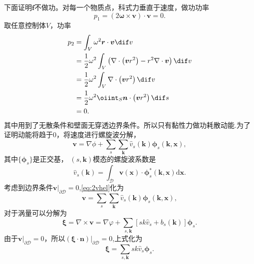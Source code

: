 \documentclass[12pt]{ctexart}
\begin{document}
下面证明$\bm{f}$不做功。对每一个物质点，科式力垂直于速度，做功功率
\begin{equation}
	p_1 = (2 \bm{\omega} \times \bm{v}) \cdot \bm{v} = 0.
\end{equation}
取任意控制体$V$，功率
\begin{equation}
	\begin{aligned}
		p_2 & =  \int_V \omega^2\bm{r} \cdot \bm{v} \dif v                                                                          \\
		    & =      \frac{1}{2} \omega^2 \int_V \left( \nabla \cdot \left(\bm{v}r^2\right) - r^2 \nabla \cdot \bm{v}\right) \dif v \\
		    & =      \frac{1}{2} \omega^2 \int_V \nabla \cdot \left(\bm{v}r^2\right)  \dif v                                        \\
		    & =      \frac{1}{2} \omega^2 \oiint_S \bm{n} \cdot \left(\bm{v}r^2\right)  \dif s                                      \\
		    & =0.
	\end{aligned}
\end{equation}
其中用到了无散条件和壁面无穿透边界条件。所以只有黏性力做功耗散动能.为了证明动能将趋于$0$，将速度进行螺旋波分解，\cite{yang_su_wu_2010}
\begin{equation}
	\bm{v}=\nabla \phi+\sum_{s} \sum_{\bm{k}} \widehat{v}_{s}(\bm{k}) \bm{\phi}_{s}(\bm{k}, \bm{x}),
	\label{eq:2vhel}
\end{equation}
其中$\{\bm{\phi}_{s}\}$是正交基， $(s,\bm{k})$模态的螺旋波系数是
\begin{equation}
	\widehat{v}_{s}(\boldsymbol{k})=\int_{\mathscr{D}} \boldsymbol{v}(\boldsymbol{x}) \cdot \boldsymbol{\phi}_{s}^{*}(\boldsymbol{k}, \boldsymbol{x}) \mathrm{d} \boldsymbol{x}.
\end{equation}
考虑到边界条件$\bm{v}\big|_{\partial \mathscr{D}}=0$,\cref{eq:2vhel}化为
\begin{equation}
	\bm{v}=\sum_{s} \sum_{\bm{k}} \widehat{v}_{s}(\bm{k}) \bm{\phi}_{s}(\bm{k}, \bm{x}),
	\label{eq:2vhel1}
\end{equation}
对于涡量可以分解为
\begin{equation}
	\bm{\xi}=\nabla \times \boldsymbol{v}=\nabla \varphi+\sum_{s, \boldsymbol{k}}\left[s k \widehat{v}_{s}+b_{s}(\boldsymbol{k})\right] \boldsymbol{\phi}_{s}.
\end{equation}
由于$\bm{v}\big|_{\partial \mathscr{D}}=0$，所以$(\bm{\xi}\cdot \bm{n})\big|_{\partial \mathscr{D}}=0$,上式化为
\begin{equation}
	\bm{\xi}=\sum_{s, \boldsymbol{k}}s k \widehat{v}_{s} \boldsymbol{\phi}_{s}.
\end{equation}
\end{document}

